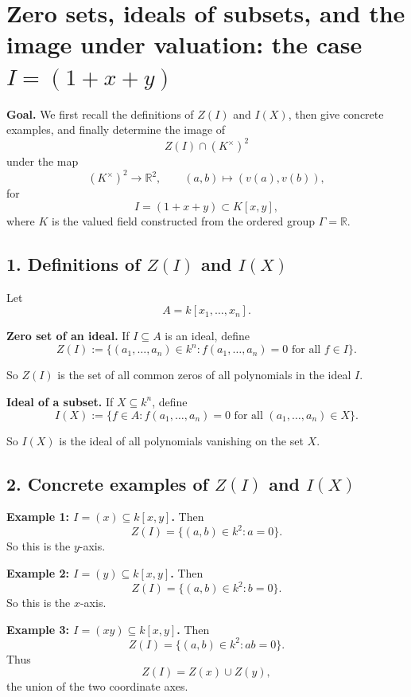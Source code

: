 \documentclass[12pt,a4paper]{article}
\theoremstyle{notespace}
\begin{document}
	
\section{Zero sets, ideals of subsets, and the image under valuation: the case \(I=(1+x+y)\)}

\textbf{Goal.}
We first recall the definitions of \(Z(I)\) and \(I(X)\), then give concrete examples, and finally determine the image of
\[
Z(I)\cap (K^\times)^2
\]
under the map
\[
(K^\times)^2\to \mathbb R^2,
\qquad
(a,b)\mapsto (v(a),v(b)),
\]
for
\[
I=(1+x+y)\subset K[x,y],
\]
where \(K\) is the valued field constructed from the ordered group \(\Gamma=\mathbb R\).

\subsection{1. Definitions of \(Z(I)\) and \(I(X)\)}

Let
\[
A=k[x_1,\dots,x_n].
\]

\textbf{Zero set of an ideal.}
If \(I\subseteq A\) is an ideal, define
\[
Z(I):=\{(a_1,\dots,a_n)\in k^n : f(a_1,\dots,a_n)=0 \text{ for all } f\in I\}.
\]

So \(Z(I)\) is the set of all common zeros of all polynomials in the ideal \(I\).

\medskip

\textbf{Ideal of a subset.}
If \(X\subseteq k^n\), define
\[
I(X):=\{f\in A : f(a_1,\dots,a_n)=0 \text{ for all } (a_1,\dots,a_n)\in X\}.
\]

So \(I(X)\) is the ideal of all polynomials vanishing on the set \(X\).

\subsection{2. Concrete examples of \(Z(I)\) and \(I(X)\)}

\textbf{Example 1: \(I=(x)\subseteq k[x,y]\).}
Then
\[
Z(I)=\{(a,b)\in k^2 : a=0\}.
\]
So this is the \(y\)-axis.

\medskip

\textbf{Example 2: \(I=(y)\subseteq k[x,y]\).}
Then
\[
Z(I)=\{(a,b)\in k^2 : b=0\}.
\]
So this is the \(x\)-axis.

\medskip

\textbf{Example 3: \(I=(xy)\subseteq k[x,y]\).}
Then
\[
Z(I)=\{(a,b)\in k^2 : ab=0\}.
\]
Thus
\[
Z(I)=Z(x)\cup Z(y),
\]
the union of the two coordinate axes.

\medskip
\end{document}
